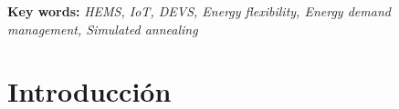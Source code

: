 \documentclass[11pt,a4paper]{book}
\begin{document}
\vspace{1cm}

\noindent\textbf{Key words: }\textit{HEMS, IoT, DEVS, Energy flexibility, Energy demand management, Simulated annealing}

\printglossaries
\tableofcontents 
\listoftables
\listoffigures
\lstlistoflistings

\mainmatter

\chapter{Introducción}


\end{document}
